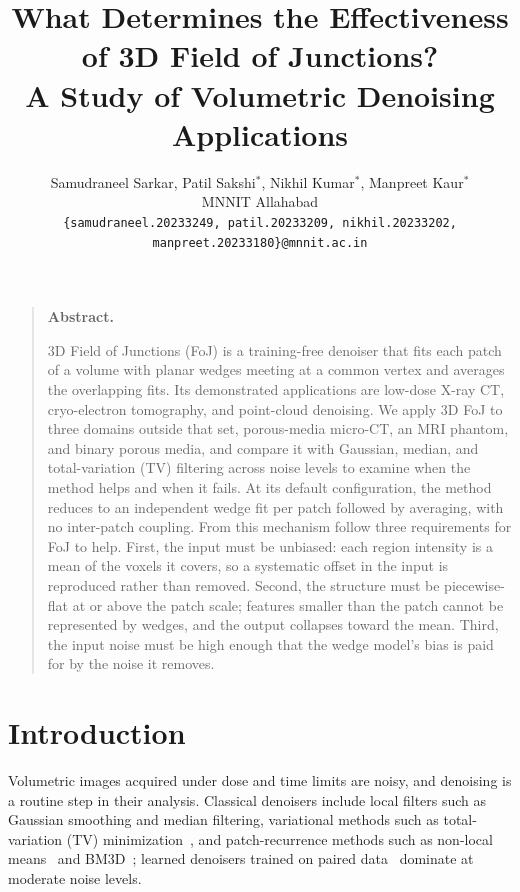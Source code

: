 \documentclass[11pt]{article}
\title{What Determines the Effectiveness of 3D Field of Junctions?\\
{\large A Study of Volumetric Denoising Applications}}
\author{Samudraneel Sarkar, Patil Sakshi$^{*}$, Nikhil Kumar$^{*}$,
Manpreet Kaur$^{*}$\\[1.4em]
MNNIT Allahabad\\[0.2em]
{\small\texttt{\{samudraneel.20233249, patil.20233209, nikhil.20233202,
manpreet.20233180\}@mnnit.ac.in}}}
\date{}
\renewenvironment{abstract}{%
  \par\small\begin{quote}%
  \noindent\textbf{Abstract.}\enspace\ignorespaces
}{\end{quote}}
\begin{document}
\maketitle
\begingroup\renewcommand{\thefootnote}{}%
%
\endgroup
\vspace{-2em}

\begin{abstract}
3D Field of Junctions (FoJ) is a training-free denoiser that fits each
patch of a volume with planar wedges meeting at a common vertex and
averages the overlapping fits. Its demonstrated applications are
low-dose X-ray CT, cryo-electron tomography, and point-cloud denoising.
We apply 3D FoJ to three domains outside that set, porous-media
micro-CT, an MRI phantom, and binary porous media, and compare it with
Gaussian, median, and total-variation (TV) filtering across noise
levels to examine when the method helps and when it fails. At its
default configuration, the method reduces to an independent wedge fit
per patch followed by averaging, with no inter-patch coupling. From
this mechanism follow three requirements for FoJ to help. First, the
input must be unbiased: each region intensity is a mean of the voxels
it covers, so a systematic offset in the input is reproduced rather
than removed. Second, the structure must be piecewise-flat at or above
the patch scale; features smaller than the patch cannot be represented
by wedges, and the output collapses toward the mean. Third, the input
noise must be high enough that the wedge model's bias is paid for by
the noise it removes.
\end{abstract}

\section{Introduction}

Volumetric images acquired under dose and time limits are noisy, and
denoising is a routine step in their analysis. Classical denoisers
include local filters such as Gaussian smoothing and median filtering,
variational methods such as total-variation (TV)
minimization~\cite{rudin1992nonlinear,chambolle2004algorithm}, and
patch-recurrence methods such as non-local means~\cite{buades2005nonlocal}
and BM3D~\cite{dabov2007image}; learned denoisers trained on paired
data~\cite{zhang2017beyond} dominate at moderate noise levels.
\end{document}
